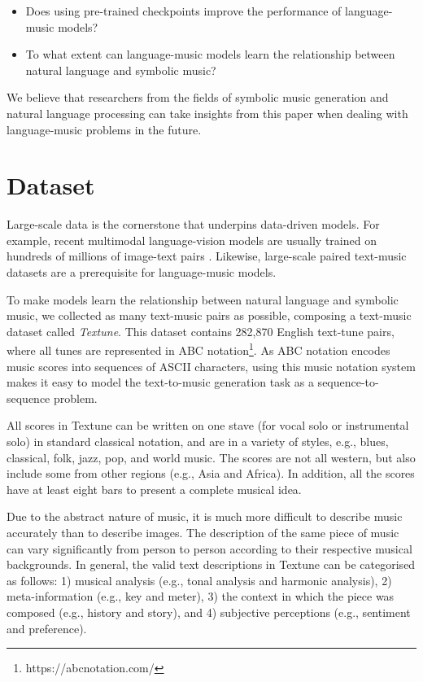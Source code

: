 \documentclass[letterpaper]{article} %
\begin{document}
\begin{itemize}
    \item Does using pre-trained checkpoints improve the performance of language-music models?
    \item To what extent can language-music models learn the relationship between natural language and symbolic music?
\end{itemize}
\textbf{\textit{}}

We believe that researchers from the fields of symbolic music generation and natural language processing can take insights from this paper when dealing with language-music problems in the future.

\section{Dataset}
Large-scale data is the cornerstone that underpins data-driven models. For example, recent multimodal language-vision models are usually trained on hundreds of millions of image-text pairs \cite{DBLP:journals/corr/abs-2111-02114}. Likewise, large-scale paired text-music datasets are a prerequisite for language-music models.

To make models learn the relationship between natural language and symbolic music, we collected as many text-music pairs as possible, composing a text-music dataset called \textit{Textune}. This dataset contains 282,870 English text-tune pairs, where all tunes are represented in ABC notation\footnote{https://abcnotation.com/}. As ABC notation encodes music scores into sequences of ASCII characters, using this music notation system makes it easy to model the text-to-music generation task as a sequence-to-sequence problem.

All scores in Textune can be written on one stave (for vocal solo or instrumental solo) in standard classical notation, and are in a variety of styles, e.g., blues, classical, folk, jazz, pop, and world music. The scores are not all western, but also include some from other regions (e.g., Asia and Africa). In addition, all the scores have at least eight bars to present a complete musical idea.

Due to the abstract nature of music, it is much more difficult to describe music accurately than to describe images. The description of the same piece of music can vary significantly from person to person according to their respective musical backgrounds. In general, the valid text descriptions in Textune can be categorised as follows: 1) musical analysis (e.g., tonal analysis and harmonic analysis), 2) meta-information (e.g., key and meter), 3) the context in which the piece was composed (e.g., history and story), and 4) subjective perceptions (e.g., sentiment and preference).
\end{document}
